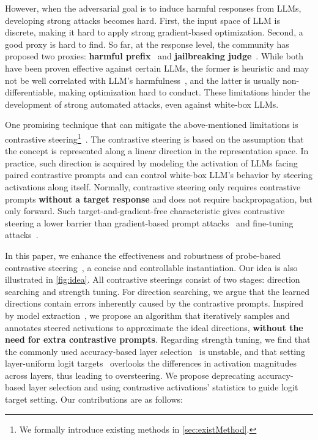 \documentclass{article}
\theoremstyle{plain}
\theoremstyle{definition}
\theoremstyle{remark}
\begin{document}
However, when the adversarial goal is to induce harmful responses from LLMs, developing strong attacks becomes hard. First, the input space of LLM is discrete, making it hard to apply strong gradient-based optimization. Second, a good proxy is hard to find. So far, at the response level, the community has proposed two proxies: \textbf{harmful prefix}~\cite{carliniAlign,gcg} and \textbf{jailbreaking judge}~\cite{pair, tap}. While both have been proven effective against certain LLMs, the former is heuristic and may not be well correlated with LLM's harmfulness~\cite{badPrefix1, badPrefix2, advprefix}, and the latter is usually non-differentiable, making optimization hard to conduct. These limitations hinder the development of strong automated attacks, even against white-box LLMs.

One promising technique that can mitigate the above-mentioned limitations is contrastive steering\footnote{We formally introduce existing methods in \cref{sec:existMethod}.}~\cite{rep, singleDirection}. The contrastive steering is based on the assumption that the concept is represented along a linear direction in the representation space. In practice, such direction is acquired by modeling the activation of LLMs facing paired contrastive prompts and can control white-box LLM's behavior by steering activations along itself. Normally, contrastive steering only requires contrastive prompts \textbf{without a target response} and does not require backpropagation, but only forward. Such target-and-gradient-free characteristic gives contrastive steering a lower barrier than gradient-based prompt attacks~\cite{gcg} and fine-tuning attacks~\cite{finetune}.%

In this paper, we enhance the effectiveness and robustness of probe-based contrastive steering~\cite{scav, mera}, a concise and controllable instantiation. Our idea is also illustrated in \cref{fig:idea}. All contrastive steerings consist of two stages: direction searching and strength tuning. For direction searching, we argue that the learned directions contain errors inherently caused by the contrastive prompts. Inspired by model extraction~\cite{tramerSteal}, we propose an algorithm that iteratively samples and annotates steered activations to approximate the ideal directions, \textbf{without the need for extra contrastive prompts}. Regarding strength tuning, we find that the commonly used accuracy-based layer selection~\cite{scav} is unstable, and that setting layer-uniform logit targets~\cite{scav, mera} overlooks the differences in activation magnitudes across layers, thus leading to oversteering. We propose deprecating accuracy-based layer selection and using contrastive activations' statistics to guide logit target setting. Our contributions are as follows:
\end{document}
